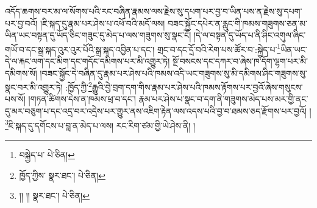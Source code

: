 འདོད་ཆགས་བར་མ་ལ་སོགས་པའི་རང་བཞིན་རྣམས་ལས་རྗེས་སུ་དཔག་པར་བྱ་བ་ཡིན་པས་ན་རྗེས་སུ་དཔག་པར་བྱ་བའོ། །ཇི་སྐད་དུ་རྣམ་པར་ཤེས་པ་འཕོ་བའི་མདོ་ལས། བཟང་སྐྱོང་དཔེར་ན་རླུང་གི་ཁམས་གཟུགས་ཅན་མ་ཡིན་ཡང་བསྟན་དུ་ཡོད་ཅིང་གཟུང་དུ་མེད་པ་ལས་གཟུགས་སུ་སྣང་ངོ། །དེ་ལ་བསྟན་དུ་ཡོད་པ་ནི་ཤིང་འགུལ་ཞིང་གཡོ་བ་དང་སྒྲ་སྐད་འུར་འུར་པོའི་སྒྲ་སྐད་འབྱིན་པ་དང་། གྲང་བ་དང་དྲོ་བའི་རེག་པས་ཚོར་བ་:སྐྱེད་པ་\footnote{བསྐྱེད་པ་  པེ་ཅིན། }ཡིན་ཡང་དེ་ལ་རྐང་ལག་དང་མིག་དང་གདོང་དམིགས་པར་མི་འགྱུར་ཏེ། སྔོ་བསངས་དང་དཀར་བ་ཞེས་ཁ་དོག་ལྷག་པར་མི་དམིགས་སོ། །བཟང་སྐྱོང་དེ་བཞིན་དུ་རྣམ་པར་ཤེས་པའི་ཁམས་འདི་ཡང་གཟུགས་སུ་མི་དམིགས་ཤིང་གཟུགས་སུ་སྣང་བར་མི་འགྱུར་ཏེ། :ཁྱོད་ཀྱི་\footnote{ཁྱོད་ཀྱིས་  སྣར་ཐང་།  པེ་ཅིན། }རྒྱུའི་བྱེ་བྲག་དག་གིས་རྣམ་པར་ཤེས་པའི་ཁམས་རྟོགས་པར་བྱའོ་ཞེས་གསུངས་པས་སོ། །གཏན་ཚིགས་དེས་ན་ཁམས་ཕྲ་བ་དང་། རྣམ་པར་ཤེས་པ་སྣང་བ་དག་ནི་གཟུགས་མེད་པས་མར་གྱི་ནང་དུ་མར་བཅུག་པ་དང་འདྲ་བར་འདྲེས་པར་གྱུར་ནས་འཇིག་རྟེན་ལས་འདས་པའི་བྱ་བ་ཐམས་ཅད་རྫོགས་པར་བྱའོ། །\footnote{།། །།  སྣར་ཐང་།  པེ་ཅིན། }ཇི་སྐད་དུ་དགོངས་པ་བླ་ན་མེད་པ་ལས། རང་རིག་ཙམ་གྱི་ཡེ་ཤེས་ནི། །
